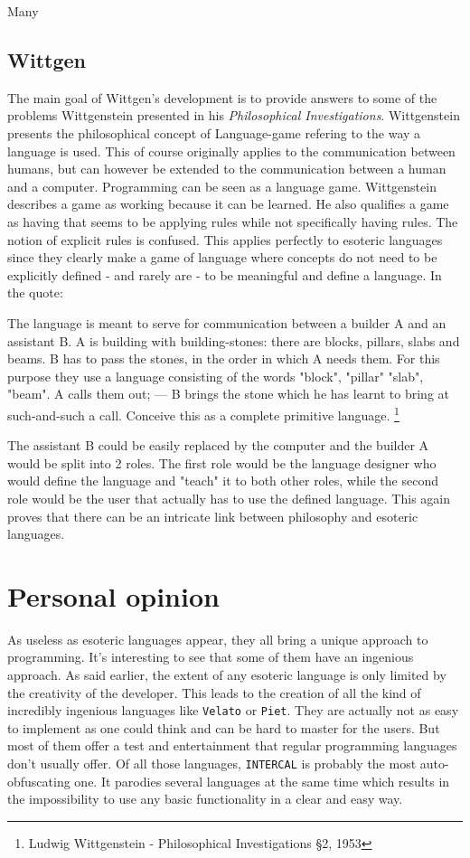 \documentclass[4paper]{article}
\begin{document}
Many 

\subsection{Wittgen}
The main goal of Wittgen's development is to provide answers to some of the problems Wittgenstein presented in his \textit{Philosophical Investigations}. Wittgenstein presents the philosophical concept of Language-game refering to the way a language is used. This of course originally applies to the communication between humans, but can however be extended to the communication between a human and a computer. Programming can be seen as a language game. Wittgenstein describes a game as working because it can be learned. He also qualifies a game as having that seems to be applying rules while not specifically having rules. The notion of explicit rules is confused. This applies perfectly to esoteric languages since they clearly make a game of language where concepts do not need to be explicitly defined - and rarely are - to be meaningful and define a language.
In the quote:
\begin{displayquote}
The language is meant to serve for communication between a builder A and an assistant B. A is building with building-stones: there are blocks, pillars, slabs and beams. B has to pass the stones, in the order in which A needs them. For this purpose they use a language consisting of the words "block", "pillar" "slab", "beam". A calls them out; — B brings the stone which he has learnt to bring at such-and-such a call. Conceive this as a complete primitive language. \footnote{Ludwig Wittgenstein - Philosophical Investigations \S2, 1953}
\end{displayquote}
The assistant B could be easily replaced by the computer and the builder A would be split into 2 roles. The first role would be the language designer who would define the language and "teach" it to both other roles, while the second role would be the user that actually has to use the defined language. This again proves that there can be an intricate link between philosophy and esoteric languages.


\section{Personal opinion}
As useless as esoteric languages appear, they all bring a unique approach to programming. It's interesting to see that some of them have an ingenious approach. As said earlier, the extent of any esoteric language is only limited by the creativity of the developer. This leads to the creation of all the kind of incredibly ingenious languages like \texttt{Velato} or \texttt{Piet}. They are actually not as easy to implement as one could think and can be hard to master for the users. But most of them offer a test and entertainment that regular programming languages don't usually offer. Of all those languages, \texttt{INTERCAL} is probably the most auto-obfuscating one. It parodies several languages at the same time which results in the impossibility to use any basic functionality in a clear and easy way. 
\end{document}
